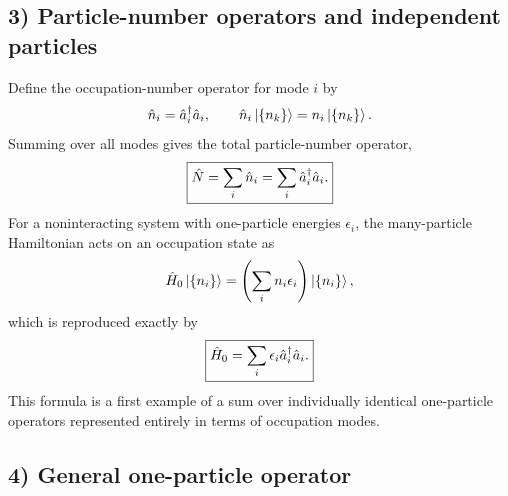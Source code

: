 \subsection*{3) Particle-number operators and independent particles}

Define the occupation-number operator for mode $i$ by
\begin{equation}
\hat{n}_i=\hat{a}_i^\dagger\hat{a}_i,\qquad
\hat{n}_i\left|\{n_k\}\right\rangle=n_i\left|\{n_k\}\right\rangle.
\end{equation}
Summing over all modes gives the total particle-number operator,
\begin{equation}
\boxed{\hat{N}=\sum_i\hat{n}_i=\sum_i\hat{a}_i^\dagger\hat{a}_i.}
\end{equation}
For a noninteracting system with one-particle energies $\epsilon_i$, the many-particle Hamiltonian acts on an occupation state as
\begin{equation}
\hat{H}_0\left|\{n_i\}\right\rangle=\left(\sum_i n_i\epsilon_i\right)\left|\{n_i\}\right\rangle,
\end{equation}
which is reproduced exactly by
\begin{equation}
\boxed{\hat{H}_0=\sum_i\epsilon_i\hat{a}_i^\dagger\hat{a}_i.}
\end{equation}
This formula is a first example of a sum over individually identical one-particle operators represented entirely in terms of occupation modes.

\subsection*{4) General one-particle operator}

